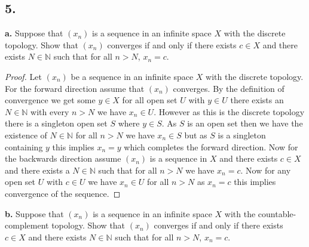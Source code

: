 \documentclass{amsart}
\theoremstyle{plain}
\theoremstyle{definition}
\theoremstyle{remark}
\begin{document}
\vspace{.15in}

\noindent
\subsection*{5.}

{\bfseries a.} Suppose that $(x_n)$ is a sequence in an infinite space $X$ with the discrete topology. Show that $(x_n)$ converges if and only if there exists $c\in X$ and there exists $N\in \mathbb N$ such that for all $n > N$, $x_n = c$.

\begin{proof}
    Let $(x_n)$ be a sequence in an infinite space $X$ with the discrete topology. 
    For the forward direction assume that $(x_n)$ converges. By the definition of convergence we get some $y\in X$ for all open set $U$ with $y\in U$ there exists an $N\in \mathbb{N}$ with every $n>N$ we have $x_n\in U$. However as this is the discrete topology there is a singleton open set  $S$ where $y\in S$. As $S$ is an open set then we have the existence of $N\in \mathbb{N}$ for all $n>N$ we have $x_n\in S$ but as $S$ is a singleton containing $y$ this implies $x_n=y$ which completes the forward direction. 
    Now for the backwards direction assume $(x_n)$ is a sequence in $X$ and there exists $c\in X$ and there exists a $N\in \mathbb{N}$ such that for all $n>N$ we have $x_n=c$. Now for any open set $U$ with $c\in U$ we have $x_n\in U$ for all $n>N$ as $x_n=c$ this implies convergence of the sequence.


\end{proof}

\vspace{.1in}
{\bfseries b.} Suppose that $(x_n)$ is a sequence in an infinite space $X$ with the countable-complement topology. Show that $(x_n)$ converges if and only if there exists $c\in X$ and there exists $N\in \mathbb N$ such that for all $n > N$, $x_n = c$.
\end{document}
